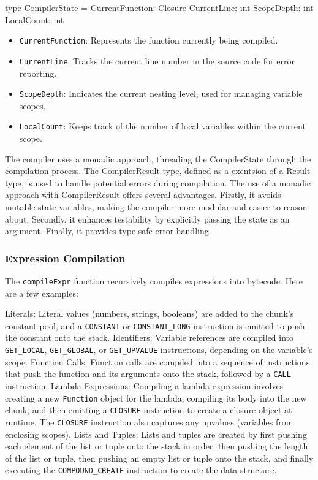 type CompilerState =
    { CurrentFunction: Closure
      CurrentLine: int
      ScopeDepth: int
      LocalCount: int }

\begin{itemize}
\item \texttt{CurrentFunction}:  Represents the function currently being compiled.
\item \texttt{CurrentLine}: Tracks the current line number in the source code for error reporting.
\item \texttt{ScopeDepth}:  Indicates the current nesting level, used for managing variable scopes.
\item \texttt{LocalCount}: Keeps track of the number of local variables within the current scope.
\end{itemize}

The compiler uses a monadic approach, threading the CompilerState through the compilation process. The CompilerResult type, defined as a exentsion of a Result type, is used to handle potential errors during compilation. 
The use of a monadic approach with CompilerResult offers several advantages. Firstly, it avoids mutable state variables, making the compiler more modular and easier to reason about. Secondly, it enhances testability by explicitly passing the state as an argument. 
Finally, it provides type-safe error handling.
\subsubsection{Expression Compilation}

The \texttt{compileExpr} function recursively compiles expressions into bytecode. Here are a few examples:

    Literals: Literal values (numbers, strings, booleans) are added to the chunk's constant pool, and a \texttt{CONSTANT} or \texttt{CONSTANT_LONG} instruction is emitted to push the constant onto the stack.
    Identifiers: Variable references are compiled into \texttt{GET_LOCAL}, \texttt{GET_GLOBAL}, or \texttt{GET_UPVALUE} instructions, depending on the variable's scope.
    Function Calls: Function calls are compiled into a sequence of instructions that push the function and its arguments onto the stack, followed by a \texttt{CALL} instruction.
    Lambda Expressions: Compiling a lambda expression involves creating a new \texttt{Function} object for the lambda, compiling its body into the new chunk, and then emitting a \texttt{CLOSURE} instruction to create a closure object at runtime. The \texttt{CLOSURE} instruction also captures any upvalues (variables from enclosing scopes).
    Lists and Tuples: Lists and tuples are created by first pushing each element of the list or tuple onto the stack in order, then pushing the length of the list or tuple, then pushing an empty list or tuple onto the stack, and finally executing the \texttt{COMPOUND_CREATE} instruction to create the data structure.

